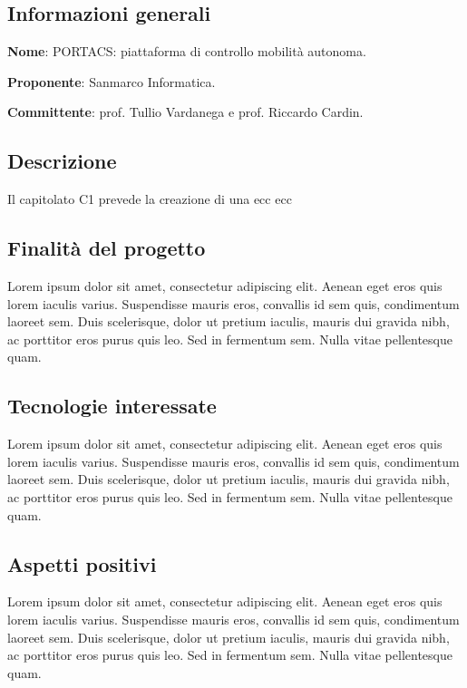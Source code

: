 \documentclass[../studio-di-fattibilita.tex]{subfiles}
\begin{document}
\subsection{Informazioni generali}%
\label{sub:informazioni_generale}
\begin{description}
  \item \textbf{Nome}: PORTACS: piattaforma di controllo mobilità autonoma.
  \item \textbf{Proponente}: Sanmarco Informatica.
  \item \textbf{Committente}: prof. Tullio Vardanega e prof. Riccardo Cardin.
\end{description}

\subsection{Descrizione}%
\label{sub:descrizione}
Il capitolato C1 prevede la creazione di una  ecc ecc

\subsection{Finalità del progetto}%
\label{sub:finalita_del_progetto}
Lorem ipsum dolor sit amet, consectetur adipiscing elit. Aenean eget eros quis lorem iaculis varius. Suspendisse mauris eros, convallis id sem quis, condimentum laoreet sem. Duis scelerisque, dolor ut pretium iaculis, mauris dui gravida nibh, ac porttitor eros purus quis leo. Sed in fermentum sem. Nulla vitae pellentesque quam.



\subsection{Tecnologie interessate}%
\label{sub:tecnologie_interessate}
Lorem ipsum dolor sit amet, consectetur adipiscing elit. Aenean eget eros quis lorem iaculis varius. Suspendisse mauris eros, convallis id sem quis, condimentum laoreet sem. Duis scelerisque, dolor ut pretium iaculis, mauris dui gravida nibh, ac porttitor eros purus quis leo. Sed in fermentum sem. Nulla vitae pellentesque quam.


\subsection{Aspetti positivi}%
\label{sub:aspetti_positivi}
Lorem ipsum dolor sit amet, consectetur adipiscing elit. Aenean eget eros quis lorem iaculis varius. Suspendisse mauris eros, convallis id sem quis, condimentum laoreet sem. Duis scelerisque, dolor ut pretium iaculis, mauris dui gravida nibh, ac porttitor eros purus quis leo. Sed in fermentum sem. Nulla vitae pellentesque quam.
\end{document}
